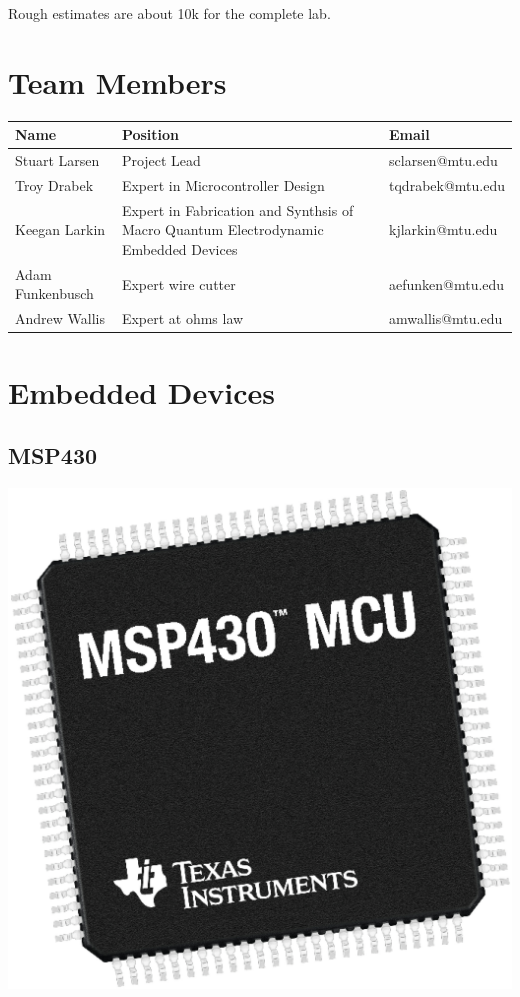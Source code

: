 \documentclass[12pt]{article}
\begin{document}
\noindent
Rough estimates are about 10k for the complete lab. 


\section{Team Members}
\begin{center}
  \begin{tabular}{  l | p{8cm} | l }
    Name & Position & Email \\
    \hline
    Stuart Larsen & Project Lead & sclarsen@mtu.edu \\ 
    Troy Drabek & Expert in Microcontroller Design & tqdrabek@mtu.edu \\
    Keegan Larkin & Expert in Fabrication and Synthsis of Macro Quantum Electrodynamic Embedded Devices  & kjlarkin@mtu.edu \\
    Adam Funkenbusch & Expert wire cutter & aefunken@mtu.edu \\
    Andrew Wallis & Expert at ohms law & amwallis@mtu.edu \\

  \end{tabular}
\end{center}

\section{Embedded Devices}

\subsection{MSP430}
\begin{center}
  \includegraphics[scale=0.25]{images/msp430image}
\end{center}
\end{document}
